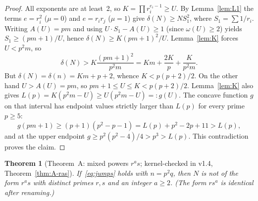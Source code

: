 \documentclass[11pt,reqno]{amsart}
\newtheorem{theorem}{Theorem}
\theoremstyle{definition}
\begin{document}
\begin{proof}
All exponents are at least~2, so \(K=\prod r_i^{e_i-1}\ge U\). By Lemma~\ref{lem:L1} the terms \(e=r_i^2\) (\(\mu=0\)) and \(e=r_ir_j\) (\(\mu=1\)) give \(\delta(N)\ge N S_1^2\), where \(S_1=\sum 1/r_i\). Writing \(A(U)=pm\) and using \(U\cdot S_1-A(U)\ge 1\) (since \(\omega(U)\ge 2\)) yields \(S_1\ge(pm+1)/U\), hence \(\delta(N)\ge K(pm+1)^2/U\). Lemma~\ref{lem:K} forces \(U<p^2m\), so
\[
\delta(N)>K\frac{(pm+1)^2}{p^2m}=Km+\frac{2K}{p}+\frac{K}{p^2m}.
\]
But \(\delta(N)=\delta(n)=Km+p+2\), whence \(K<p(p+2)/2\). On the other hand \(U>A(U)=pm\), so \(pm+1\le U\le K<p(p+2)/2\). Lemma~\ref{lem:K} also gives \(L(p)=K(p^2m-U)\ge U(p^2m-U)=:g(U)\). The concave function \(g\) on that interval has endpoint values strictly larger than \(L(p)\) for every prime \(p\ge 5\):
\[
g(pm+1)\ge(p+1)(p^2-p-1)=L(p)+p^2-2p+11>L(p),
\]
and at the upper endpoint \(g\ge p^2(p^2-4)/4>p^3>L(p)\). This contradiction proves the claim.
\end{proof}

\begin{theorem}[Theorem~A: mixed powers \(r^as\); kernel-checked in v1.4, Theorem~\ref{thm:A-ras}]
\label{thm:A}
If~\eqref{eq:jumps} holds with \(n=p^2q\), then \(N\) is not of the form \(r^as\) with distinct primes \(r,s\) and an integer \(a\ge 2\). (The form \(rs^a\) is identical after renaming.)
\end{theorem}
\end{document}
